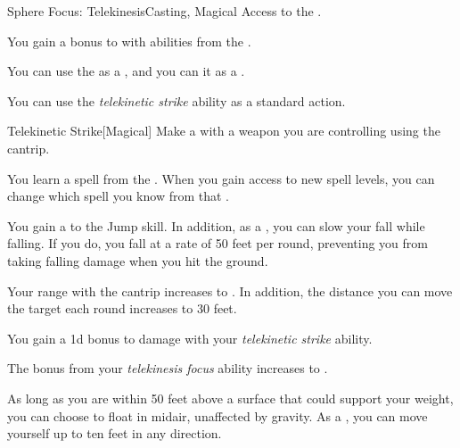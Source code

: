     \begin{feat}{Sphere Focus: Telekinesis}{Casting, Magical}
        \featpre Access to the  .

         You gain a  bonus to  with abilities from the  .

         You can use the   as a , and you can  it as a .

         You can use the \textit{telekinetic strike} ability as a standard action.
        \begin{freeability}{Telekinetic Strike}[Magical]
            Make a  with a weapon you are controlling using the  cantrip.
        \end{freeability}

         You learn a spell from the  .
        When you gain access to new spell levels, you can change which spell you know from that .

         You gain a   to the Jump skill.
        In addition, as a , you can slow your fall while falling.
        If you do, you fall at a rate of 50 feet per round, preventing you from taking falling damage when you hit the ground.

         Your range with the  cantrip increases to \rngmed.
        In addition, the distance you can move the target each round increases to 30 feet.

         You gain a \plus1d bonus to damage with your \textit{telekinetic strike} ability.

         The bonus from your \textit{telekinesis focus} ability increases to .

         As long as you are within 50 feet above a surface that could support your weight, you can choose to float in midair, unaffected by gravity.
        As a , you can move yourself up to ten feet in any direction.
    \end{feat}

